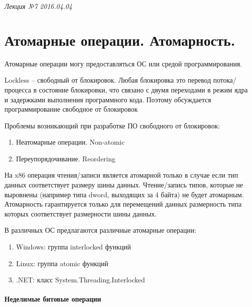 \clearpage
\begin{flushright}
	\textit{Лекция №7}
	\textit{2016.04.04}
\end{flushright}

\section{Атомарные операции. Атомарность.}

Атомарные операции могу предоставляться ОС или средой программирования.

Lockless – свободный от блокировок. Любая блокировка это перевод потока/процесса в состояние блокировки, что связано с двумя переходами в режим ядра и задержками выполнения программного кода. Поэтому обсуждается программирование свободное от блокировок \cite{Dawson_Lockless}

Проблемы возникающий при разработке ПО свободного от блокировок:
\begin{enumerate}
	\item Неатомарные операции. Non-atomic
	\item Переупорядочивание. Reordering
\end{enumerate}

На x86 операция чтения/записи является атомарной только в случае если тип данных соответствует размеру шины данных. Чтение/запись типов,  которые не выровнены (например типа dword, выходящих за 4 байта) не будет атомарным. Атомарность гарантируется только для перемещений данных размерность типа которых соответствует размерности шины данных.

В различных ОС предлагаются различные атомарные операции:
\begin{enumerate}
	\item Windows: группа interlocked функций
	\item Linux: группа atomic функций
	\item .NET: класс System.Threading.Interlocked
\end{enumerate}

\paragraph{Неделимые битовые операции}

